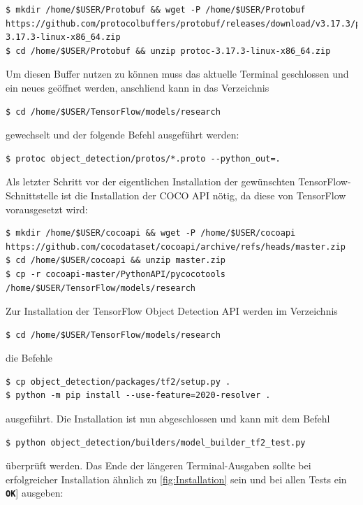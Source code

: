 \documentclass[12pt, oneside]{article}
\begin{document}
\begin{verbatim}
$ mkdir /home/$USER/Protobuf && wget -P /home/$USER/Protobuf https://github.com/protocolbuffers/protobuf/releases/download/v3.17.3/protoc-3.17.3-linux-x86_64.zip
$ cd /home/$USER/Protobuf && unzip protoc-3.17.3-linux-x86_64.zip
\end{verbatim}
Um diesen Buffer nutzen zu können muss das aktuelle Terminal geschlossen und ein neues geöffnet werden, anschliend kann in das Verzeichnis

\begin{verbatim}
$ cd /home/$USER/TensorFlow/models/research
\end{verbatim}
gewechselt und der folgende Befehl ausgeführt werden:

\begin{verbatim}
$ protoc object_detection/protos/*.proto --python_out=.
\end{verbatim}
Als letzter Schritt vor der eigentlichen Installation der gewünschten TensorFlow-Schnittstelle ist die Installation der COCO API nötig, da diese von TensorFlow vorausgesetzt wird:

\begin{verbatim}
$ mkdir /home/$USER/cocoapi && wget -P /home/$USER/cocoapi https://github.com/cocodataset/cocoapi/archive/refs/heads/master.zip
$ cd /home/$USER/cocoapi && unzip master.zip
$ cp -r cocoapi-master/PythonAPI/pycocotools /home/$USER/TensorFlow/models/research
\end{verbatim}
Zur Installation der TensorFlow Object Detection API werden im Verzeichnis

\begin{verbatim}
$ cd /home/$USER/TensorFlow/models/research
\end{verbatim}
die Befehle

\begin{verbatim}
$ cp object_detection/packages/tf2/setup.py .
$ python -m pip install --use-feature=2020-resolver .
\end{verbatim}
ausgeführt. Die Installation ist nun abgeschlossen und kann mit dem Befehl

\begin{verbatim}
$ python object_detection/builders/model_builder_tf2_test.py
\end{verbatim}
überprüft werden. Das Ende der längeren Terminal-Ausgaben sollte bei erfolgreicher Installation ähnlich zu \autoref{fig:Installation} sein und bei allen Tests ein \textbf{\texttt{OK}}] ausgeben:
\end{document}
